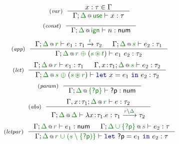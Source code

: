 \begin{figure}[t]
\begin{equation*}
\tyrule{var}
  {x : \tau \in \Gamma}
  {\coctx{\Gamma;\cclrd{\Delta}}{\cunit} \vdash x : \tau }
\end{equation*}
\begin{equation*}
\tyrule{const}
  {~}
  {\coctx{\Gamma;\cclrd{\Delta}}{\czero} \vdash n : \ident{num} }
\end{equation*}
\begin{equation*}
\tyrule{app}
  {\coctx{\Gamma;\cclrd{\Delta}}{\cclrd{r}} \vdash e_1 : \tau_1 \xrightarrow{\cclrd{t}} \tau_2 &
   \coctx{\Gamma;\cclrd{\Delta}}{\cclrd{s}} \vdash e_2 : \tau_1 }
  {\coctx{\Gamma;\cclrd{\Delta}}{\cclrd{r} \;\cpar\; (\cclrd{s} \,\cseq\, \cclrd{t})} \vdash e_1~e_2 : \tau_2}
\end{equation*}
\begin{equation*}
\tyrule{let}
  { \coctx{\Gamma;\cclrd{\Delta}}{\cclrd{r}} \vdash e_1 : \tau_1 &
    \coctx{\Gamma, x\!:\!\tau_1;\cclrd{\Delta}}{\cclrd{s}} \vdash e_2 : \tau_2}
  {\coctx{\Gamma;\cclrd{\Delta}}{\cclrd{s} \;\cpar\; (\cclrd{s} \,\cseq\, \cclrd{r})} \vdash \kvd{let}~x=e_1~\kvd{in}~e_2 : \tau_2 }
\end{equation*}
\begin{equation*}
\tyrule{param}
  { ~ }
  { \coctx{\Gamma;\cclrd{\Delta}}{\cclrd{ \{ \ident{?p} \} }} \vdash \ident{?p} : \ident{num} }
\end{equation*}
\begin{equation*}
\tyrule{abs}
  {\coctx{\Gamma, x\!:\!\tau_1;\cclrd{\Delta}}{\cclrd{r}} \vdash e : \tau_2}
  {\coctx{\Gamma;\cclrd{\Delta}}{\cclrd{\Delta}} \vdash \lambda x\!:\!\tau_1.e : \tau_1 \xrightarrow{\cclrd{r}\setminus\cclrd{\Delta}} \tau_2 }
\end{equation*}
\begin{equation*}
\tyrule{letpar}
  { \coctx{\Gamma;\cclrd{\Delta}}{\cclrd{r}} \vdash e_1 : \ident{num} &
    \coctx{\Gamma;\cclrd{\Delta \cup \{ \ident{?p} \}}}{\cclrd{s}} \vdash e_2 : \tau}
  {\coctx{\Gamma;\cclrd{\Delta}}{\cclrd{r} \;\cclrd{\cup\; (\cclrd{s} \setminus \{ \ident{?p}) \}} } \vdash \kvd{let}~\ident{?p}=e_1~\kvd{in}~e_2 : \tau }
\end{equation*}

\label{fig:flat-resolve-impl}
\end{figure}


